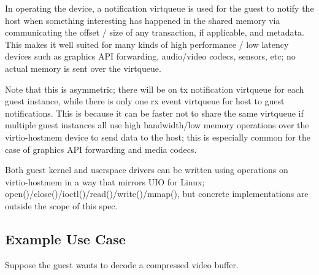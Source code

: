 In operating the device, a notification virtqueue is used for the guest to notify the host
when something interesting has happened in the shared memory via communicating
the offset / size of any transaction, if applicable, and metadata.
This makes it well suited for many kinds of high performance / low latency
devices such as graphics API forwarding, audio/video codecs, sensors, etc;
no actual memory is sent over the virtqueue.

Note that this is asymmetric;
there will be on tx notification virtqueue for each guest instance,
while there is only one rx event virtqueue for host to guest notifications.
This is because it can be faster not to share the same virtqueue
if multiple guest instances all use high bandwidth/low memory operations
over the virtio-hostmem device to send data to the host;
this is especially common for the case of graphics API forwarding
and media codecs.

Both guest kernel and userspace drivers can be written using operations
on virtio-hostmem in a way that mirrors UIO for Linux;
open()/close()/ioctl()/read()/write()/mmap(),
but concrete implementations are outside the scope of this spec.

\subsection{Example Use Case}\label{sec:Device Types / Host Memory Device / Example Use Case}

Suppose the guest wants to decode a compressed video buffer.

